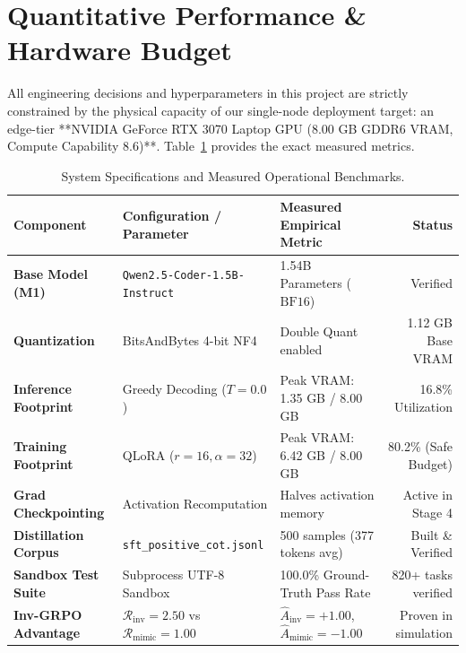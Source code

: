 \documentclass[12pt, a4paper]{article}
\begin{document}
\section{Quantitative Performance \& Hardware Budget}

All engineering decisions and hyperparameters in this project are strictly constrained by the physical capacity of our single-node deployment target: an edge-tier **NVIDIA GeForce RTX 3070 Laptop GPU (8.00 GB GDDR6 VRAM, Compute Capability 8.6)**. Table~\ref{tab:system_metrics} provides the exact measured metrics.

\begin{table}[H]
\centering
\small
\caption{System Specifications and Measured Operational Benchmarks.}
\label{tab:system_metrics}
\begin{tabularx}{\textwidth}{l p{5cm} X r}
\toprule
\textbf{Component} & \textbf{Configuration / Parameter} & \textbf{Measured Empirical Metric} & \textbf{Status} \\
\midrule
\textbf{Base Model (M1)} & \texttt{Qwen2.5-Coder-1.5B-Instruct} & 1.54B Parameters ($\text{BF16}$) & Verified \cite{qwen25coder} \\
\textbf{Quantization} & BitsAndBytes 4-bit NF4 & Double Quant enabled & 1.12 GB Base VRAM \\
\textbf{Inference Footprint} & Greedy Decoding ($T=0.0$) & Peak VRAM: 1.35 GB / 8.00 GB & 16.8\% Utilization \\
\textbf{Training Footprint} & QLoRA ($r=16, \alpha=32$) & Peak VRAM: 6.42 GB / 8.00 GB & 80.2\% (Safe Budget) \\
\textbf{Grad Checkpointing} & Activation Recomputation & Halves activation memory & Active in Stage 4 \\
\textbf{Distillation Corpus} & \texttt{sft\_positive\_cot.jsonl} & 500 samples (377 tokens avg) & Built \& Verified \\
\textbf{Sandbox Test Suite} & Subprocess UTF-8 Sandbox & 100.0\% Ground-Truth Pass Rate & 820+ tasks verified \\
\textbf{Inv-GRPO Advantage} & $\mathcal{R}_{\text{inv}} = 2.50$ vs $\mathcal{R}_{\text{mimic}} = 1.00$ & $\hat{A}_{\text{inv}} = +1.00$, $\hat{A}_{\text{mimic}} = -1.00$ & Proven in simulation \\
\bottomrule
\end{tabularx}
\end{table}
\end{document}
